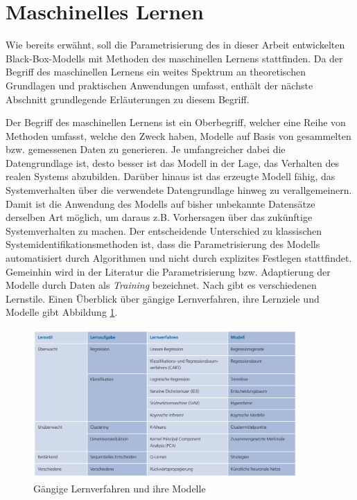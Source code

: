 \section{Maschinelles Lernen}
\label{cha:machine_learning}

Wie bereits erwähnt, soll die Parametrisierung des in dieser Arbeit entwickelten Black-Box-Modells mit Methoden des maschinellen Lernens stattfinden. Da der Begriff des maschinellen Lernens ein weites Spektrum an theoretischen Grundlagen und praktischen Anwendungen umfasst, enthält der nächste Abschnitt grundlegende Erläuterungen zu diesem Begriff.

Der Begriff des maschinellen Lernens ist ein Oberbegriff, welcher eine Reihe von Methoden umfasst, welche den Zweck haben, Modelle auf Basis von gesammelten bzw. gemessenen Daten zu generieren. Je umfangreicher dabei die Datengrundlage ist, desto besser ist das Modell in der Lage, das Verhalten des realen Systems abzubilden.  Darüber hinaus ist das erzeugte Modell fähig, das Systemverhalten über die verwendete Datengrundlage hinweg zu verallgemeinern. Damit ist die Anwendung des Modells auf bisher unbekannte Datensätze derselben Art möglich, um daraus z.B. Vorhersagen über das zukünftige Systemverhalten zu machen.  Der entscheidende Unterschied zu klassischen Systemidentifikationsmethoden ist, dass die Parametrisierung des Modells automatisiert durch Algorithmen und nicht durch explizites Festlegen stattfindet. \cite{Duriez.2017} \\
Gemeinhin wird in der Literatur die Parametrisierung bzw. Adaptierung der Modelle durch Daten als \textit{Training} bezeichnet. Nach \cite{Dobel.2018} gibt es verschiedenen Lernstile. Einen Überblick über gängige Lernverfahren, ihre Lernziele und Modelle gibt Abbildung \ref{fig:lernverfahren}.

\begin{figure} [h]
	\centering
	\includegraphics[width=0.9\textwidth]{images/lernverfahren}
	\caption{Gängige Lernverfahren und ihre Modelle \cite{Dobel.2018}}
	\label{fig:lernverfahren}
\end{figure}

